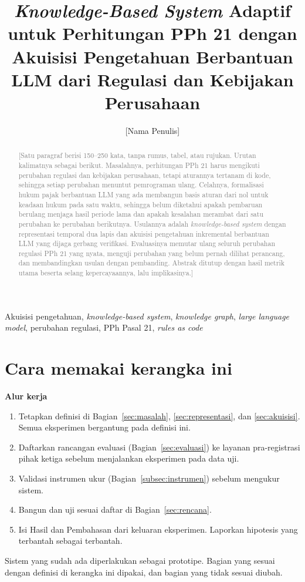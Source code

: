\documentclass[journal,a4paper]{IEEEtran}
\newcommand{\en}[1]{\textit{#1}}
\newif\ifrancangan \rancangantrue
\newcommand{\kotak}[3]{\ifrancangan\par\begingroup\scriptsize
  \def\FrameCommand{\fboxsep=3pt\fboxrule=0.4pt\fcolorbox{#1!60!black}{#1!6}}%
  \MakeFramed{\advance\hsize-\width\FrameRestore}\noindent\textbf{#2}\par #3\endMakeFramed\endgroup\fi}
\newcommand{\isian}[1]{\ifrancangan\textcolor{gray}{[#1]}\fi}
\begin{document}
\title{\en{Knowledge-Based System} Adaptif untuk Perhitungan PPh 21 dengan Akuisisi Pengetahuan Berbantuan LLM dari Regulasi dan Kebijakan Perusahaan}
\author{[Nama Penulis]}
\maketitle

\begin{abstract}
\isian{Satu paragraf berisi 150--250 kata, tanpa rumus, tabel, atau rujukan. Urutan kalimatnya sebagai berikut. Masalahnya, perhitungan PPh 21 harus mengikuti perubahan regulasi dan kebijakan perusahaan, tetapi aturannya tertanam di kode, sehingga setiap perubahan menuntut pemrograman ulang. Celahnya, formalisasi hukum pajak berbantuan LLM yang ada membangun basis aturan dari nol untuk keadaan hukum pada satu waktu, sehingga belum diketahui apakah pembaruan berulang menjaga hasil periode lama dan apakah kesalahan merambat dari satu perubahan ke perubahan berikutnya. Usulannya adalah \en{knowledge-based system} dengan representasi temporal dua lapis dan akuisisi pengetahuan inkremental berbantuan LLM yang dijaga gerbang verifikasi. Evaluasinya memutar ulang seluruh perubahan regulasi PPh 21 yang nyata, menguji perubahan yang belum pernah dilihat perancang, dan membandingkan usulan dengan pembanding. Abstrak ditutup dengan hasil metrik utama beserta selang kepercayaannya, lalu implikasinya.}
\end{abstract}

\begin{IEEEkeywords}
Akuisisi pengetahuan, \en{knowledge-based system}, \en{knowledge graph}, \en{large language model}, perubahan regulasi, PPh Pasal 21, \en{rules as code}
\end{IEEEkeywords}

\section*{Cara memakai kerangka ini}
\ifrancangan
\kotak{gray}{Alur kerja}{
\begin{enumerate}[leftmargin=*,nosep]
  \item Tetapkan definisi di Bagian~\ref{sec:masalah}, \ref{sec:representasi}, dan \ref{sec:akuisisi}. Semua eksperimen bergantung pada definisi ini.
  \item Daftarkan rancangan evaluasi (Bagian~\ref{sec:evaluasi}) ke layanan pra-registrasi pihak ketiga sebelum menjalankan eksperimen pada data uji.
  \item Validasi instrumen ukur (Bagian~\ref{subsec:instrumen}) sebelum mengukur sistem.
  \item Bangun dan uji sesuai daftar di Bagian~\ref{sec:rencana}.
  \item Isi Hasil dan Pembahasan dari keluaran eksperimen. Laporkan hipotesis yang terbantah sebagai terbantah.
\end{enumerate}
Sistem yang sudah ada diperlakukan sebagai prototipe. Bagian yang sesuai dengan definisi di kerangka ini dipakai, dan bagian yang tidak sesuai diubah.
}
\fi
\end{document}
